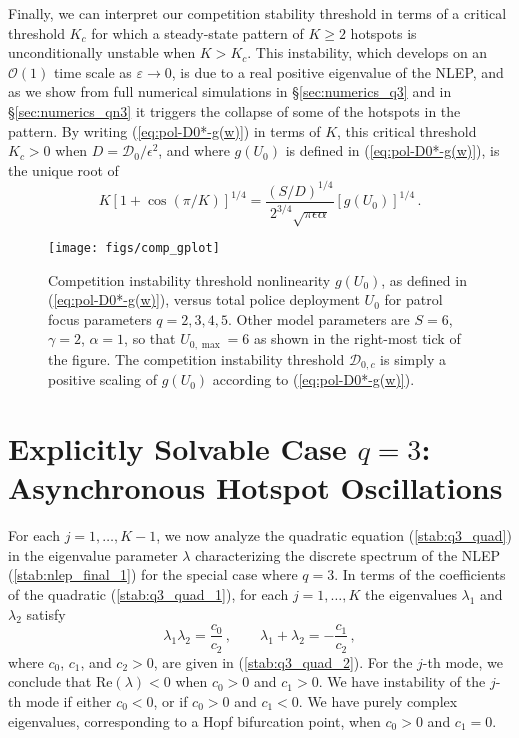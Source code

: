 \documentclass{article}%
\newcommand{\eps}{{\displaystyle \varepsilon}}
\begin{document}
Finally, we can interpret our competition stability threshold in terms
of a critical threshold $K_{c}$ for which a steady-state pattern of
$K\geq 2$ hotspots is unconditionally unstable when $K>K_{c}$.  This
instability, which develops on an ${\mathcal O}(1)$ time scale as
$\eps\to 0$, is due to a real positive eigenvalue of the NLEP, and as
we show from full numerical simulations in \S \ref{sec:numerics_q3}
and in \S \ref{sec:numerics_qn3} it triggers the collapse of some of
the hotspots in the pattern. By writing (\ref{eq:pol-D0*-g(w)}) in
terms of $K$, this critical threshold $K_{c}>0$ when $D={{\mathcal
    D}_0/\epsilon^2}$, and where $g(U_0)$ is defined in
(\ref{eq:pol-D0*-g(w)}), is the unique root of
\begin{equation}
  K \left[ 1 + \cos\left({\pi/K}\right)\right]^{1/4} =
 \frac{\left({S/D}\right)^{1/4}}{2^{3/4} \sqrt{\pi \epsilon \alpha}} \left[
   g(U_0) \right]^{1/4} \,. \label{stab:Kc+}
\end{equation}


\begin{figure}[htbp]
\centering
\texttt{[image: figs/comp\_gplot]}
\caption{\label{fig:gU0-vs-U0}Competition instability threshold
  nonlinearity $g(U_{0})$, as defined in (\ref{eq:pol-D0*-g(w)}), versus
  total police deployment $U_{0}$ for patrol focus parameters
  $q=2,3,4,5$. Other model parameters are $S=6$, $\gamma=2$, $\alpha=1$, so
  that $U_{0,\max}=6$ as shown in the right-most tick of the figure.
  The competition instability threshold ${\mathcal D}_{0,c}$ is
  simply a positive scaling of $g(U_{0})$ according to
  (\ref{eq:pol-D0*-g(w)}).}
\end{figure}

\setcounter{equation}{0}
\setcounter{section}{4}
\section{Explicitly Solvable Case $q=3$: Asynchronous Hotspot Oscillations}
\label{sec:stab_q3}

For each $j=1,\ldots,K-1$, we now analyze the quadratic equation
(\ref{stab:q3_quad}) in the eigenvalue parameter $\lambda$
characterizing the discrete spectrum of the NLEP
(\ref{stab:nlep_final_1}) for the special case where $q=3$. In terms
of the coefficients of the quadratic (\ref{stab:q3_quad_1}), for each
$j=1,\ldots,K$ the eigenvalues $\lambda_1$ and $\lambda_2$ satisfy
\begin{equation}\label{q3:lam12}
   \lambda_1 \lambda_2 = \frac{c_0}{c_2} \,, \qquad
  \lambda_1 + \lambda_2 = - \frac{c_1}{c_2} \,,
\end{equation}
where $c_0$, $c_1$, and $c_2>0$, are given in (\ref{stab:q3_quad_2}). For
the $j$-th mode, we conclude that $\mbox{Re}(\lambda)<0$ when $c_0>0$
and $c_1>0$. We have instability of the $j$-th mode if either
$c_0<0$, or if $c_0>0$ and $c_1<0$. We have purely complex eigenvalues,
corresponding to a Hopf bifurcation point, when $c_0>0$ and $c_1=0$.
\end{document}
